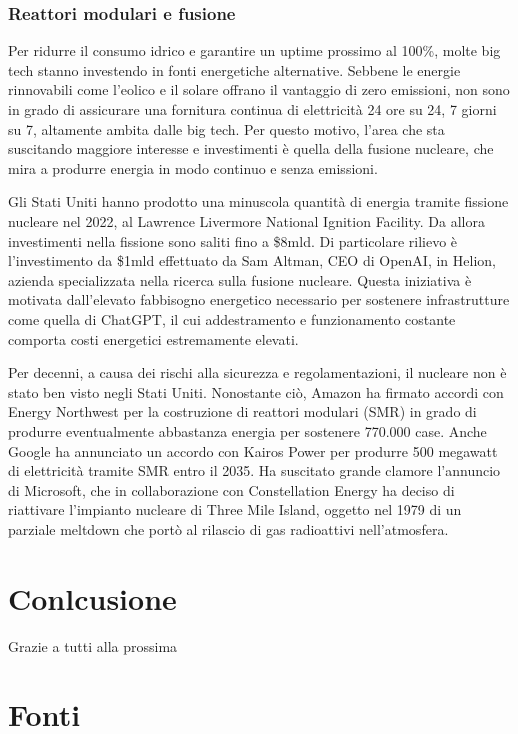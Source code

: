 \documentclass[12pt,a4paper,oneside]{book}
\begin{document}
\subsection{Reattori modulari e fusione}
Per ridurre il consumo idrico e garantire un uptime prossimo al 100\%, molte big tech stanno investendo in fonti energetiche alternative. Sebbene le energie rinnovabili come l'eolico e il solare offrano il vantaggio di zero emissioni, non sono in grado di assicurare una fornitura continua di elettricità 24 ore su 24, 7 giorni su 7, altamente ambita dalle big tech. Per questo motivo, l'area che sta suscitando maggiore interesse e investimenti è quella della fusione nucleare, che mira a produrre energia in modo continuo e senza emissioni.

Gli Stati Uniti hanno prodotto una minuscola quantità di energia tramite fissione nucleare nel 2022, al Lawrence Livermore National Ignition Facility. Da allora investimenti nella fissione sono saliti fino a \$8mld. Di particolare rilievo è l'investimento da \$1mld effettuato da Sam Altman, CEO di OpenAI, in Helion, azienda specializzata nella ricerca sulla fusione nucleare. Questa iniziativa è motivata dall'elevato fabbisogno energetico necessario per sostenere infrastrutture come quella di ChatGPT, il cui addestramento e funzionamento costante comporta costi energetici estremamente elevati.

Per decenni, a causa dei rischi alla sicurezza e regolamentazioni, il nucleare non è stato ben visto negli Stati Uniti. Nonostante ciò, Amazon ha firmato accordi con Energy Northwest per la costruzione di reattori modulari (SMR) in grado di produrre eventualmente abbastanza energia per sostenere 770.000 case. Anche Google ha annunciato un accordo con Kairos Power per produrre 500 megawatt di elettricità tramite SMR entro il 2035.
Ha suscitato grande clamore l'annuncio di Microsoft, che in collaborazione con Constellation Energy ha deciso di riattivare l'impianto nucleare di Three Mile Island, oggetto nel 1979 di un parziale meltdown che portò al rilascio di gas radioattivi nell'atmosfera.

\chapter{Conlcusione}

Grazie a tutti alla prossima

\chapter*{Fonti}
\renewcommand{\bibsection}{}
\end{document}

